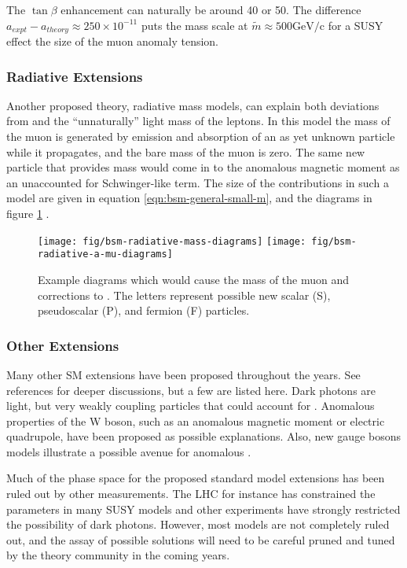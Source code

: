 The $\tan{\beta}$ enhancement can naturally be around 40 or 50.  The difference $a_{expt} - a_{theory} \approx 250 \times 10^{-11}$ puts the mass scale at $\tilde{m} \approx 500 \mathrm{GeV/c}$ for a SUSY effect the size of the muon anomaly tension.

\subsubsection{Radiative Extensions}
Another proposed theory, radiative mass models, can explain both deviations from \gmtwo and the ``unnaturally'' light mass of the leptons.  In this model the mass of the muon is generated by emission and absorption of an as yet unknown particle while it propagates, and the bare mass of the muon is zero.  The same new particle that provides mass would come in to the anomalous magnetic moment as an unaccounted for Schwinger-like term.  The size of the contributions in such a model are given in equation \ref{eqn:bsm-general-small-m}, and the diagrams in figure \ref{fig:bsm-radiative-diagrams} \cite{a-mu-harbinger}.

\begin{figure}
\centering
\texttt{[image: fig/bsm-radiative-mass-diagrams]}
\texttt{[image: fig/bsm-radiative-a-mu-diagrams]}
\caption{
    Example diagrams which would cause the mass of the muon and corrections to \mugmtwo.  The letters represent possible new scalar (S), pseudoscalar (P), and fermion (F) particles.
    \label{fig:bsm-radiative-diagrams}
}
\end{figure}

\subsubsection{Other Extensions}

Many other SM extensions have been proposed throughout the years.  See references \cite{a-mu-harbinger, the-muon-g-2, e989-tdr} for deeper discussions, but a few are listed here.  Dark photons are light, but very weakly coupling particles that could account for \mugmtwo.  Anomalous properties of the W boson, such as an anomalous magnetic moment or electric quadrupole, have been proposed as possible explanations.  Also, new gauge bosons models illustrate a possible avenue for anomalous \gmtwo.

Much of the phase space for the proposed standard model extensions has been ruled out by other measurements.  The LHC for instance has constrained the parameters in many SUSY models and other experiments have strongly restricted the possibility of dark photons.  However, most models are not completely ruled out, and the assay of possible solutions will need to be careful pruned and tuned by the theory community in the coming years.



